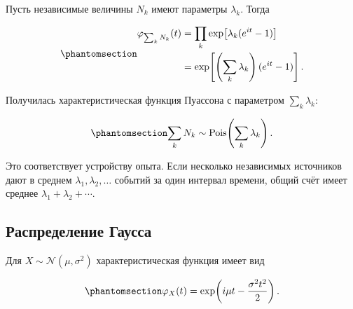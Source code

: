 \documentclass[
  russian,
  11pt,
  a4paper,
  open=any]{scrbook}
\begin{document}
Пусть независимые величины \(N_k\) имеют параметры \(\lambda_k\). Тогда

\begin{equation}\protect\phantomsection\label{eq-poisson-sum-characteristic}{
\begin{aligned}
\varphi_{\sum_k N_k}(t)
&=\prod_k\exp\!\left[\lambda_k(e^{it}-1)\right]\\
&=\exp\!\left[
\left(\sum_k\lambda_k\right)(e^{it}-1)
\right].
\end{aligned}
}\end{equation}

Получилась характеристическая функция Пуассона с параметром
\(\sum_k\lambda_k\):

\begin{equation}\protect\phantomsection\label{eq-poisson-sum-distribution}{
\sum_k N_k
\sim
\operatorname{Pois}\!\left(\sum_k\lambda_k\right).
}\end{equation}

Это соответствует устройству опыта. Если несколько независимых
источников дают в среднем \(\lambda_1,\lambda_2,\ldots\) событий за один
интервал времени, общий счёт имеет среднее
\(\lambda_1+\lambda_2+\cdots\).

\subsection{Распределение
Гаусса}\label{ux440ux430ux441ux43fux440ux435ux434ux435ux43bux435ux43dux438ux435-ux433ux430ux443ux441ux441ux430}

Для \(X\sim\mathcal N(\mu,\sigma^2)\) характеристическая функция имеет
вид

\begin{equation}\protect\phantomsection\label{eq-normal-characteristic}{
\varphi_X(t)=
\exp\!\left(i\mu t-\frac{\sigma^2t^2}{2}\right).
}\end{equation}
\end{document}

